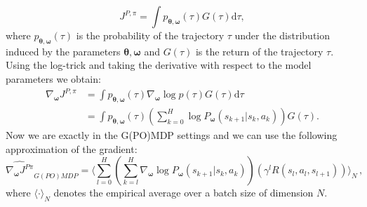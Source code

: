 $$
J^{P,\pi} = \int p_{\boldsymbol{\theta},\boldsymbol{\omega}}(\tau)G(\tau) \mathrm{d}\tau,
$$
where $p_{\boldsymbol{\theta},\boldsymbol{\omega}}(\tau)$ is the probability of the trajectory $\tau$ under the distribution induced by the parameters $\boldsymbol{\theta},\boldsymbol{\omega}$ and $G(\tau)$ is the return of the trajectory $\tau$.
Using the log-trick and taking the derivative with respect to the model parameters we obtain:
\begin{align}
	\nabla_{\boldsymbol{\omega}}J^{P,\pi} &= \int p_{\boldsymbol{\theta},\boldsymbol{\omega}}(\tau) \nabla_{\boldsymbol{\omega}}\log p(\tau) G(\tau) \mathrm{d}\tau \\
	&= \int p_{\boldsymbol{\theta},\boldsymbol{\omega}}(\tau) \left(\sum_{k=0}^{H} \log P_{\boldsymbol{\omega}}(s_{k+1} | s_k, a_k)  \right) G(\tau) .
\end{align}
Now we are exactly in the G(PO)MDP settings and we can use the following approximation of the gradient:
\begin{equation}
\widehat{\nabla_{\boldsymbol{\omega}} J^{P\pi}}_{G(PO)MDP} = \langle \sum_{l=0}^H \left( \sum_{k=l}^H \nabla_{\bm{\omega}} \log P_{\boldsymbol{\omega}}(s_{k+1} | s_k, a_k) \right) \left( \gamma^l R(s_l,a_l, s_{l+1}) \right) \rangle_N \, ,
\end{equation}
where $\langle \cdot \rangle_N$ denotes the empirical average over a batch size of dimension $N$.